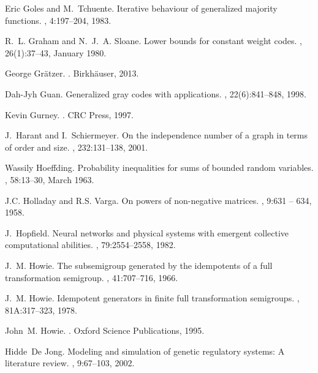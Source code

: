 \documentclass[a4paper, 11pt]{book}
\numberwithin{equation}{section}
\theoremstyle{plain}
\renewcommand{\(}{\ldbrack}
\renewcommand{\)}{\rdbrack}
\begin{document}
\begin{thebibliography}{100}
Eric Goles and M.~Tchuente.
\newblock Iterative behaviour of generalized majority functions.
, 4:197--204, 1983.

R.~L. Graham and N.~J.~A. Sloane.
\newblock Lower bounds for constant weight codes.
, 26(1):37--43, January
  1980.

George Gr\"atzer.
.
\newblock Birkh\"auser, 2013.

Dah-Jyh Guan.
\newblock Generalized gray codes with applications.
, 22(6):841--848, 1998.

Kevin Gurney.
.
\newblock CRC Press, 1997.

J.~Harant and I.~Schiermeyer.
\newblock On the independence number of a graph in terms of order and size.
, 232:131--138, 2001.

Wassily Hoeffding.
\newblock Probability inequalities for sums of bounded random variables.
, 58:13--30,
  March 1963.

J.C. Holladay and R.S. Varga.
\newblock On powers of non-negative matrices.
, 9:631 -- 634,
  1958.

J.~Hopfield.
\newblock Neural networks and physical systems with emergent collective
  computational abilities.
, 79:2554--2558, 1982.

J.~M. Howie.
\newblock The subsemigroup generated by the idempotents of a full
  transformation semigroup.
, 41:707--716, 1966.

J.~M. Howie.
\newblock Idempotent generators in finite full transformation semigroups.
, 81A:317--323, 1978.

John~M. Howie.
.
\newblock Oxford Science Publications, 1995.

Hidde~De Jong.
\newblock Modeling and simulation of genetic regulatory systems: A literature
  review.
, 9:67--103, 2002.


\end{thebibliography}
\end{document}
